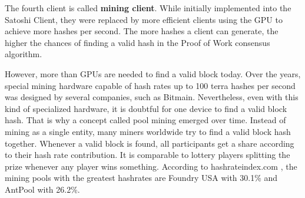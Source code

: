 The fourth client is called \textbf{mining client}.
While initially implemented into the Satoshi Client, they were replaced by more efficient clients using the GPU to achieve more hashes per second.
The more hashes a client can generate, the higher the chances of finding a valid hash in the Proof of Work consensus algorithm. \cite{skudnov2012bitcoin}

However, more than GPUs are needed to find a valid block today.
Over the years, special mining hardware capable of hash rates up to 100 terra hashes per second was designed by several companies, such as Bitmain. \cite{bitmain_shop}
Nevertheless, even with this kind of specialized hardware, it is doubtful for one device to find a valid block hash.
That is why a concept called pool mining emerged over time.
Instead of mining as a single entity, many miners worldwide try to find a valid block hash together.
Whenever a valid block is found, all participants get a share according to their hash rate contribution.
It is comparable to lottery players splitting the prize whenever any player wins something. \cite{lewenberg2015bitcoin} 
According to hashrateindex.com \cite{hashrate}, the mining pools with the greatest hashrates are Foundry USA with 30.1\% and AntPool with 26.2\%.
